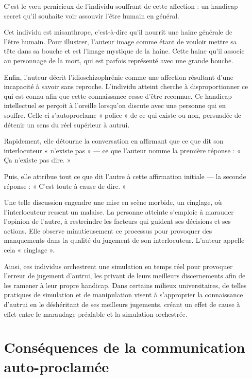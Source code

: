 \documentclass[12pt,oneside]{article}
\begin{document}
C'est le vœu pernicieux de l'individu souffrant de cette affection : un handicap secret qu'il souhaite voir assouvir l'être humain en général.

Cet individu est misanthrope, c'est-à-dire qu'il nourrit une haine générale de l'être humain. Pour illustrer, l'auteur image comme étant de vouloir mettre sa tête dans sa bouche et est l'image mystique de la haine. Cette haine qu'il associe au personnage de la mort, qui est parfois représenté avec une grande bouche.

Enfin, l'auteur décrit l'idioschizophrénie comme une affection résultant d'une incapacité à savoir sans reproche. L'individu atteint cherche à disproportionner ce qui est connu afin que cette connaissance cesse d'être reconnue. Ce handicap intellectuel se perçoit à l'oreille lorsqu'on discute avec une personne qui en souffre. Celle-ci s'autoproclame « police » de ce qui existe ou non, persuadée de détenir un sens du réel supérieur à autrui.

Rapidement, elle détourne la conversation en affirmant que ce que dit son interlocuteur « n'existe pas » --- ce que l'auteur nomme la première réponse : « Ça n'existe pas dire. »

Puis, elle attribue tout ce que dit l'autre à cette affirmation initiale --- la seconde réponse : « C'est toute à cause de dire. »

Une telle discussion engendre une mise en scène morbide, un cinglage, où l'interlocuteur ressent un malaise. La personne atteinte s'emploie à marauder l'opinion de l'autre, à restreindre les facteurs qui guident ses décisions et ses actions. Elle observe minutieusement ce processus pour provoquer des manquements dans la qualité du jugement de son interlocuteur. L'auteur appelle cela « cinglage ».

Ainsi, ces individus orchestrent une simulation en temps réel pour provoquer l'erreur de jugement d'autrui, les privant de leurs meilleurs discernements afin de les ramener à leur propre handicap. Dans certains milieux universitaires, de telles pratiques de simulation et de manipulation visent à s'approprier la connaissance d'autrui en le déshéritant de ses meilleurs jugements, créant un effet de cause à effet entre le maraudage préalable et la simulation orchestrée.

\section{Conséquences de la communication auto-proclamée}
\end{document}
